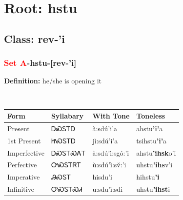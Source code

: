 \needspace{4in}
\section*{Root: hstu}
\nopagebreak
{}
\needspace{3in}
\subsection*{Class: rev-'i}
\nopagebreak
\needspace{2in}
\subsubsection*{\textcolor{Red}{Set A}{-}\textbf{hstu}{-}[rev-'i]}
\nopagebreak
\textbf{Definition: } he/she is opening it
\\[0.5em]
\begin{tabularx}{\textwidth}{l X X X}%
\toprule%
\textbf{Form}&\textbf{Syllabary}&\textbf{With Tone}&\textbf{Toneless}\\%
\midrule%
Present&ᎠᏍᏚᎢᎠ&à:sdú’i’a&ahstu\textbf{'i'}a\\%
1st Present&ᏥᏍᏚᎢᎠ&jì:sdú’i’a&tsihstu\textbf{'i'}a\\%
Imperfective&ᎠᏍᏚᎢᏍᎪᎢ&à:sdú’ì:sgó:’i&ahstu\textbf{'ihsk}o'i\\%
Perfective&ᎤᏍᏚᎢᏒᎢ&ù:sdú’ì:sv̌:’i&uhstu\textbf{'ihs}v'i\\%
Imperative&ᎯᏍᏚᎢ&hisdu’i&hihstu\textbf{'i}\\%
Infinitive&ᎤᏍᏚᎢᏍᏗ&u:sdu’ì:sdi&uhstu\textbf{'ihst}i\\%
\bottomrule%
\end{tabularx}
\\[1em]